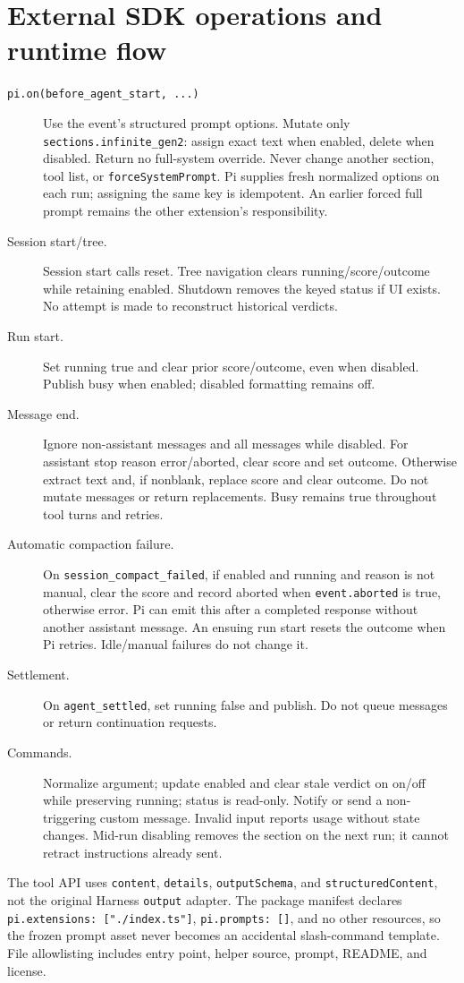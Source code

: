 \documentclass[10pt]{ltjsarticle}
\begin{document}
\section{External SDK operations and runtime flow}
\begin{description}
\item[\texttt{pi.on(before\_agent\_start, ...)}] Use the event's structured
prompt options. Mutate only \texttt{sections.infinite\_gen2}: assign exact text
when enabled, delete when disabled. Return no full-system override. Never
change another section, tool list, or \texttt{forceSystemPrompt}. Pi supplies
fresh normalized options on each run; assigning the same key is idempotent.
An earlier forced full prompt remains the other extension's responsibility.
\item[Session start/tree.] Session start calls reset. Tree navigation clears
running/score/outcome while retaining enabled. Shutdown removes the keyed
status if UI exists. No attempt is made to reconstruct historical verdicts.
\item[Run start.] Set running true and clear prior score/outcome, even when
disabled. Publish busy when enabled; disabled formatting remains off.
\item[Message end.] Ignore non-assistant messages and all messages while
disabled. For assistant stop reason error/aborted, clear score and set outcome.
Otherwise extract text and, if nonblank, replace score and clear outcome.
Do not mutate messages or return replacements. Busy remains true throughout
tool turns and retries.
\item[Automatic compaction failure.] On \texttt{session\_compact\_failed}, if
enabled and running and reason is not manual, clear the score and record
aborted when \texttt{event.aborted} is true, otherwise error. Pi can emit this
after a completed response without another assistant message. An ensuing run
start resets the outcome when Pi retries. Idle/manual failures do not change it.
\item[Settlement.] On \texttt{agent\_settled}, set running false and publish.
Do not queue messages or return continuation requests.
\item[Commands.] Normalize argument; update enabled and clear stale verdict on
on/off while preserving running; status is read-only. Notify or send a non-triggering custom message.
Invalid input reports usage without state changes. Mid-run disabling removes
the section on the next run; it cannot retract instructions already sent.
\end{description}
The tool API uses \texttt{content}, \texttt{details}, \texttt{outputSchema},
and \texttt{structuredContent}, not the original Harness \texttt{output}
adapter. The package manifest declares \texttt{pi.extensions: ["./index.ts"]},
\texttt{pi.prompts: []}, and no other resources, so the frozen prompt asset
never becomes an accidental slash-command template. File allowlisting includes
entry point, helper source, prompt, README, and license.
\end{document}
